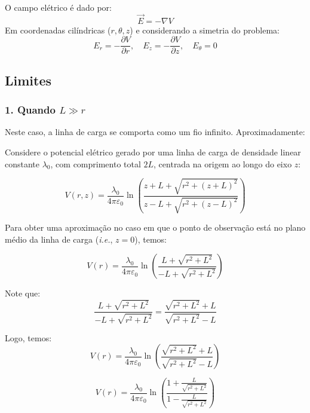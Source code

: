 \documentclass[a4paper,12pt]{article}
\begin{document}
O campo elétrico é dado por:
\begin{equation}
\vec{E} = -\nabla V
\end{equation}
Em coordenadas cilíndricas (\( r, \theta, z \)) e considerando a simetria do problema:
\begin{equation}
E_r = -\frac{\partial V}{\partial r}, \quad E_z = -\frac{\partial V}{\partial z}, \quad E_\theta = 0
\end{equation}

\subsection*{Limites}

\subsubsection*{1. Quando \( L \gg r \)}

Neste caso, a linha de carga se comporta como um fio infinito. Aproximadamente:

Considere o potencial elétrico gerado por uma linha de carga de densidade linear constante $\lambda_0$, com comprimento total $2L$, centrada na origem ao longo do eixo $z$:

\begin{equation}
V(r,z) = \frac{\lambda_0}{4\pi \varepsilon_0} \ln \left( \frac{z + L + \sqrt{r^2 + (z + L)^2}}{z - L + \sqrt{r^2 + (z - L)^2}} \right)
\end{equation}

Para obter uma aproximação no caso em que o ponto de observação está no plano médio da linha de carga (\textit{i.e.}, $z = 0$), temos:

\begin{equation}
V(r) = \frac{\lambda_0}{4\pi \varepsilon_0} \ln \left( \frac{L + \sqrt{r^2 + L^2}}{-L + \sqrt{r^2 + L^2}} \right)
\end{equation}

Note que:
\begin{equation}
\frac{L + \sqrt{r^2 + L^2}}{-L + \sqrt{r^2 + L^2}} = \frac{\sqrt{r^2 + L^2} + L}{\sqrt{r^2 + L^2} - L}
\end{equation}

Logo, temos:
\begin{equation}
\boxed{V(r) = \frac{\lambda_0}{4\pi \varepsilon_0} \ln \left( \frac{\sqrt{r^2 + L^2} + L}{\sqrt{r^2 + L^2} - L} \right)}
\end{equation}

\begin{equation}
V(r) = \frac{\lambda_0}{4\pi \varepsilon_0} \ln \left( \frac{1 + \frac{L}{\sqrt{r^2 + L^2}}}{1 - \frac{L}{\sqrt{r^2 + L^2}}} \right)
\end{equation}
\end{document}
